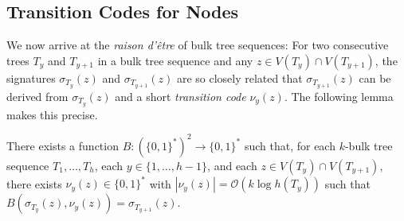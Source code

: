\documentclass[kpfonts]{patmorin}
\newcommand{\snote}[1]{\fcolorbox{red}{yellow}{#1}}
\newcommand{\Oh}{\mathcal{O}}
\begin{document}
\subsection{Transition Codes for Nodes}

We now arrive at the \emph{raison d'être} of bulk tree sequences:  For two consecutive trees $T_y$ and $T_{y+1}$ in a bulk tree sequence and any $z\in V(T_y)\cap V(T_{y+1})$, the signatures $\sigma_{T_y}(z)$ and $\sigma_{T_{y+1}}(z)$ are so closely related that $\sigma_{T_{y+1}}(z)$ can be derived from $\sigma_{T_y}(z)$ and a short \emph{transition code} $\nu_y(z)$.  The following lemma makes this precise.

\begin{lem}
  There exists a function $B:(\{0,1\}^*)^2\to\{0,1\}^*$ such that, for each $k$-bulk tree sequence $T_1,\ldots,T_h$, each $y\in\{1,\ldots,h-1\}$, and each $z\in V(T_y)\cap V(T_{y+1})$, there exists $\nu_y(z)\in\{0,1\}^*$ with $|\nu_y(z)| = \Oh(k\log h(T_y))$ such that $B(\sigma_{T_y}(z), \nu_y(z)) = \sigma_{T_{y+1}}(z)$.
\end{lem}


\end{document}
